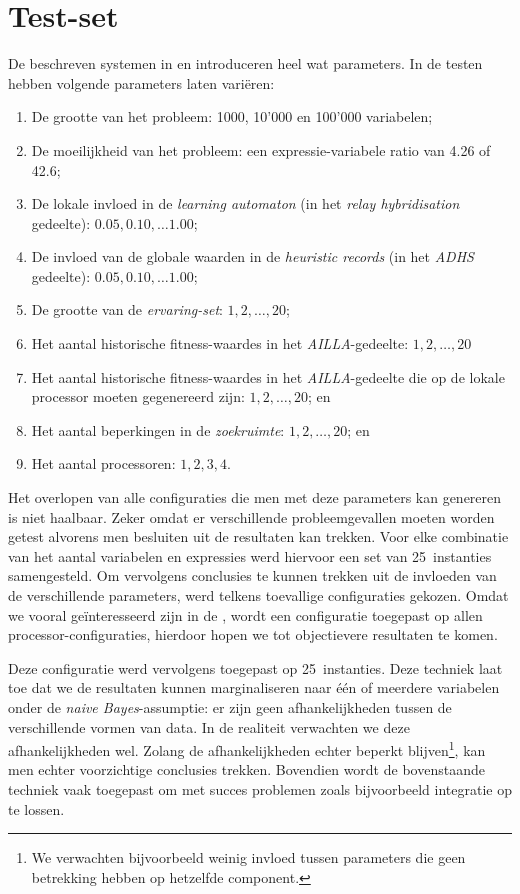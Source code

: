 \section{Test-set}

De beschreven systemen in  en  introduceren heel wat parameters. In de testen hebben volgende parameters laten vari\"eren:
\begin{enumerate}
 \item De grootte van het probleem: 1000, 10'000 en 100'000 variabelen;
 \item De moeilijkheid van het probleem: een expressie-variabele ratio van 4.26 of 42.6;
 \item De lokale invloed in de \emph{learning automaton} (in het \emph{relay hybridisation} gedeelte): $0.05,0.10,\ldots1.00$;
 \item De invloed van de globale waarden in de \emph{heuristic records} (in het \emph{ADHS} gedeelte): $0.05,0.10,\ldots1.00$;
 \item De grootte van de \emph{ervaring-set}: $1,2,\ldots,20$;
 \item Het aantal historische fitness-waardes in het \emph{AILLA}-gedeelte: $1,2,\ldots,20$
 \item Het aantal historische fitness-waardes in het \emph{AILLA}-gedeelte die op de lokale processor moeten gegenereerd zijn: $1,2,\ldots,20$; en
 \item Het aantal beperkingen in de \emph{zoekruimte}: $1,2,\ldots,20$; en
 \item Het aantal processoren: $1,2,3,4$.
\end{enumerate}

Het overlopen van alle configuraties die men met deze parameters kan genereren is niet haalbaar. Zeker omdat er verschillende probleemgevallen moeten worden getest alvorens men besluiten uit de resultaten kan trekken. Voor elke combinatie van het aantal variabelen en expressies werd hiervoor een set van 25~instanties samengesteld. Om vervolgens conclusies te kunnen trekken uit de invloeden van de verschillende parameters, werd telkens toevallige configuraties gekozen. Omdat we vooral ge\"interesseerd zijn in de \absu{}, wordt een configuratie toegepast op allen processor-configuraties, hierdoor hopen we tot objectievere resultaten te komen.

Deze configuratie werd vervolgens toegepast op 25~instanties. Deze techniek laat toe dat we de resultaten kunnen marginaliseren naar \'e\'en of meerdere variabelen onder de \emph{naive Bayes}-assumptie: er zijn geen afhankelijkheden tussen de verschillende vormen van data. In de realiteit verwachten we deze afhankelijkheden wel. Zolang de afhankelijkheden echter beperkt blijven\footnote{We verwachten bijvoorbeeld weinig invloed tussen parameters die geen betrekking hebben op hetzelfde component.}, kan men echter voorzichtige conclusies trekken. Bovendien wordt de bovenstaande techniek vaak toegepast om met succes problemen zoals bijvoorbeeld integratie op te lossen.

